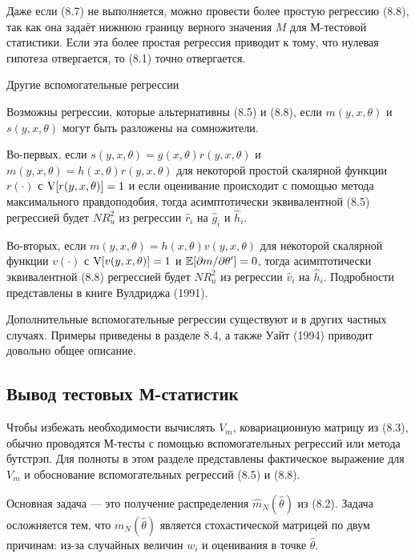 Даже если (8.7) не выполняется, можно провести более простую регрессию (8.8), так как она задаёт нижнюю границу верного значения $M$ для М-тестовой статистики. Если эта более простая регрессия приводит к тому, что нулевая гипотеза отвергается, то (8.1) точно отвергается.

\begin{center}
Другие вспомогательные регрессии
\end{center}

Возможны регрессии, которые альтернативны (8.5) и (8.8), если $m(y, x, \theta)$ и $s(y, x, \theta)$ могут быть разложены на сомножители.

Во-первых, если $s(y, x, \theta) = g(x, \theta)r(y, x, \theta)$ и $m(y, x, \theta) = h(x, \theta)r(y, x, \theta)$ для некоторой простой скалярной функции $r(\cdot)$ с $\mathrm{V}[r(y, x, \theta)] = 1$ и если оценивание происходит с помощью метода максимального правдоподобия, тогда асимптотически эквивалентной (8.5) регрессией будет $NR_u^2$ из регрессии $\hat{r}_i$ на $\hat{g}_i$ и $\hat{h}_i$.

Во-вторых, если $m(y, x, \theta) = h(x, \theta)v(y, x, \theta)$ для некоторой скалярной функции $v(\cdot)$ с $\mathrm{V}[v(y, x, \theta)] = 1$ и $\mathbb{E}[\partial{m}/\partial{\theta}'] = 0$, тогда асимптотически эквивалентной (8.8) регрессией будет $NR_u^2$ из регрессии $\hat{v}_i$ на $\hat{h}_i$. Подробности представлены в книге Вулдриджа (1991).

Дополнительные вспомогательные регрессии существуют и в других частных случаях. Примеры приведены в разделе 8.4, а также Уайт (1994) приводит довольно общее описание.

\subsection{Вывод тестовых М-статистик}

Чтобы избежать необходимости вычислять $V_m$, ковариационную матрицу из (8.3), обычно проводятся М-тесты с помощью вспомогательных регрессий или метода бутстрэп. Для полноты в этом разделе представлены фактическое выражение для $V_m$ и обоснование вспомогательных регрессий (8.5) и (8.8).

Основная задача --- это получение распределения $\hat{m}_N(\hat{\theta})$ из (8.2). Задача осложняется тем, что $m_N(\hat{\theta})$ является стохастической матрицей по двум причинам: из-за случайных величин $w_i$ и оценивания в точке $\hat{\theta}$.

